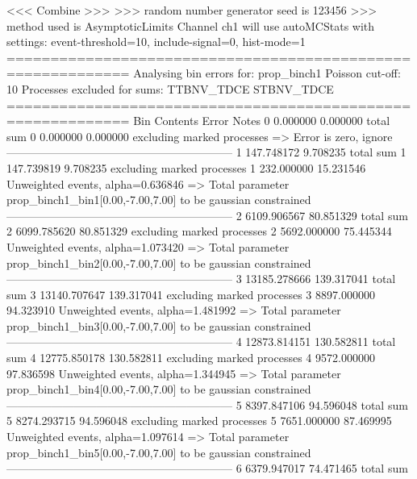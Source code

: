  <<< Combine >>> 
>>> random number generator seed is 123456
>>> method used is AsymptoticLimits
Channel ch1 will use autoMCStats with settings: event-threshold=10, include-signal=0, hist-mode=1
============================================================
Analysing bin errors for: prop_binch1
Poisson cut-off: 10
Processes excluded for sums: TTBNV_TDCE STBNV_TDCE
============================================================
Bin        Contents        Error           Notes                         
0          0.000000        0.000000        total sum                     
0          0.000000        0.000000        excluding marked processes    
  => Error is zero, ignore      
------------------------------------------------------------
1          147.748172      9.708235        total sum                     
1          147.739819      9.708235        excluding marked processes    
1          232.000000      15.231546       Unweighted events, alpha=0.636846
  => Total parameter prop_binch1_bin1[0.00,-7.00,7.00] to be gaussian constrained
------------------------------------------------------------
2          6109.906567     80.851329       total sum                     
2          6099.785620     80.851329       excluding marked processes    
2          5692.000000     75.445344       Unweighted events, alpha=1.073420
  => Total parameter prop_binch1_bin2[0.00,-7.00,7.00] to be gaussian constrained
------------------------------------------------------------
3          13185.278666    139.317041      total sum                     
3          13140.707647    139.317041      excluding marked processes    
3          8897.000000     94.323910       Unweighted events, alpha=1.481992
  => Total parameter prop_binch1_bin3[0.00,-7.00,7.00] to be gaussian constrained
------------------------------------------------------------
4          12873.814151    130.582811      total sum                     
4          12775.850178    130.582811      excluding marked processes    
4          9572.000000     97.836598       Unweighted events, alpha=1.344945
  => Total parameter prop_binch1_bin4[0.00,-7.00,7.00] to be gaussian constrained
------------------------------------------------------------
5          8397.847106     94.596048       total sum                     
5          8274.293715     94.596048       excluding marked processes    
5          7651.000000     87.469995       Unweighted events, alpha=1.097614
  => Total parameter prop_binch1_bin5[0.00,-7.00,7.00] to be gaussian constrained
------------------------------------------------------------
6          6379.947017     74.471465       total sum                     
